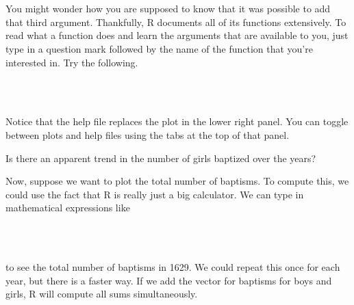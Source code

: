 \documentclass[11pt]{article}
\begin{document}
\ttfamily
\hlstd{}\hspace*{\fill}\\
\hlstd{}\hlkeyword{(}\hlargument{=}{\ }\hlkeyword{\usebox{\hlnormalsizeboxdollar}}\hlkeyword{,}{\ }\hlargument{=}{\ }\hlkeyword{\usebox{\hlnormalsizeboxdollar}}\hlkeyword{,}{\ }\hlargument{=}{\ }\hlkeyword{)}\hspace*{\fill}\\
\normalfont

You might wonder how you are supposed to know that it was possible to add that third argument.  Thankfully, R documents all of its functions extensively. To read what a function does and learn the arguments that are available to you, just type in a question mark followed by the name of the function that you're interested in. Try the following.

\ttfamily
\hlstd{}\hspace*{\fill}\\
\hlstd{}\hspace*{\fill}\\
\normalfont

Notice that the help file replaces the plot  in the lower right panel.  You can toggle between plots and help files using the tabs at the top of that panel.

\begin{exercise}
Is there an apparent trend in the number of girls baptized over the years?
\end{exercise}

Now, suppose we want to plot the total number of baptisms.  To compute this, we could use the fact that R is really just a big calculator. We can type in mathematical expressions like

\ttfamily
\hlstd{}\hspace*{\fill}\\
\hlstd{}\hlkeyword{+}{\ }\hspace*{\fill}\\
\normalfont

to see the total number of baptisms in 1629. We could repeat this once for each year, but there is a faster way. If we add the vector for baptisms for boys and girls, R will compute all sums simultaneously.

\ttfamily
\hlstd{}\hspace*{\fill}\\
\hlstd{}\hlkeyword{\usebox{\hlnormalsizeboxdollar}}\hlkeyword{+}{\ }\hlkeyword{\usebox{\hlnormalsizeboxdollar}}\hspace*{\fill}\\
\normalfont
\end{document}
